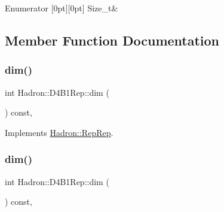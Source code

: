 \begin{DoxyEnumFields}{Enumerator}
[0pt][0pt]{}\mbox{\label{structHadron_1_1D4B1Rep_ac855b1d537c90bbdb4416bd00f02e6b9a8bd8705c9eae0e6d8f1c1909363ca41b}} 
Size\+\_\+t&\\
\hline

\end{DoxyEnumFields}


\subsection{Member Function Documentation}
\mbox{\label{structHadron_1_1D4B1Rep_adac801c8769811e585d8c984477629ae}} 
\subsubsection{\texorpdfstring{dim()}{dim()}\hspace{0.1cm}{\footnotesize\ttfamily [1/3]}}
{\footnotesize\ttfamily int Hadron\+::\+D4\+B1\+Rep\+::dim (\begin{DoxyParamCaption}{ }\end{DoxyParamCaption}) const\hspace{0.3cm}{\ttfamily [inline]}, {\ttfamily [virtual]}}



Implements \mbox{\hyperlink{structHadron_1_1RepRep_a92c8802e5ed7afd7da43ccfd5b7cd92b}{Hadron\+::\+Rep\+Rep}}.

\mbox{\label{structHadron_1_1D4B1Rep_adac801c8769811e585d8c984477629ae}} 
\subsubsection{\texorpdfstring{dim()}{dim()}\hspace{0.1cm}{\footnotesize\ttfamily [2/3]}}
{\footnotesize\ttfamily int Hadron\+::\+D4\+B1\+Rep\+::dim (\begin{DoxyParamCaption}{ }\end{DoxyParamCaption}) const\hspace{0.3cm}{\ttfamily [inline]}, {\ttfamily [virtual]}}



